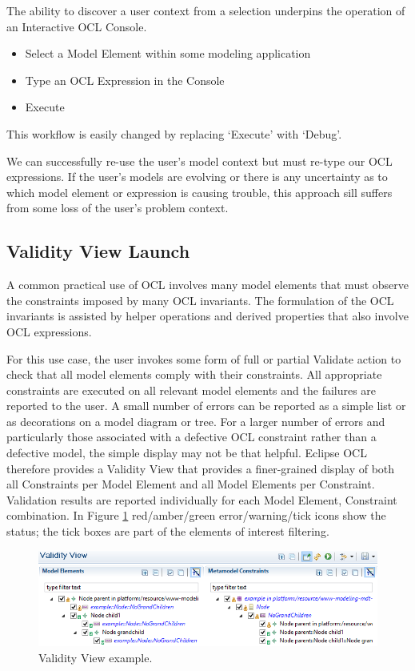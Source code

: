 \documentclass[a4paper]{article}
\begin{document}
The ability to discover a user context from a selection underpins the operation of an Interactive OCL Console.

\begin{itemize}
\item Select a Model Element within some modeling application
\item Type an OCL Expression in the Console
\item Execute
\end{itemize}

This workflow is easily changed by replacing `Execute' with `Debug'.

We can successfully re-use the user's model context but must re-type our OCL expressions. If the user's models are evolving or there is any uncertainty as to which model element or expression is causing trouble, this approach sill suffers from some loss of the user's problem context.

\subsection{Validity View Launch}

A common practical use of OCL involves many model elements that must observe the constraints imposed by many OCL invariants. The formulation of the OCL invariants is assisted by helper operations and derived properties that also involve OCL expressions.

For this use case, the user invokes some form of full or partial Validate action to check that all model elements comply with their constraints. All appropriate constraints are executed on all relevant model elements and the failures are reported to the user. A small number of errors can be reported as a simple list or as decorations on a model diagram or tree. For a larger number of errors and particularly those associated with a defective OCL constraint rather than a defective model, the simple display may not be that helpful. Eclipse OCL therefore provides a Validity View that provides a finer-grained display of both all Constraints per Model Element and all Model Elements per Constraint. Validation results are reported individually for each Model Element, Constraint combination. In Figure \ref{fig:ValidityView} red/amber/green error/warning/tick icons show the status; the tick boxes are part of the elements of interest filtering.

\begin{figure}
  \begin{center}
    \includegraphics[width=6.75in]{ValidityView.png}
  \end{center}
  \caption{Validity View example.}
  \label{fig:ValidityView}
\end{figure}
\end{document}
